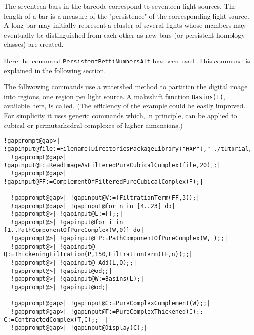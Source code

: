 \documentclass[a4paper,11pt]{report}
\begin{document}
{{\begin{Verbatim}[commandchars=!@|,fontsize=\small,frame=single,label=Example]
\end{Verbatim}
 

  

 The seventeen bars in the barcode correspond to seventeen light sources. The
length of a bar is a measure of the "persistence" of the corresponding light
source. A long bar may initially represent a cluster of several lights whose
members may eventually be distinguished from each other as new bars (or
persistent homology classes) are created. 

Here the command \texttt{PersistentBettiNumbersAlt} has been used. This command is explained in the following section. 

The follwowing commands use a watershed method to partition the digital image
into regions, one region per light source. A makeshift function \texttt{Basins(L)}, available \href{tutex/basins.g} {here}, is called. (The efficiency of the example could be easily improved. For
simplicity it uses generic commands which, in principle, can be applied to
cubical or permutarhedral complexes of higher dimensions.) 
\begin{Verbatim}[commandchars=!@|,fontsize=\small,frame=single,label=Example]
  !gapprompt@gap>| !gapinput@file:=Filename(DirectoriesPackageLibrary("HAP"),"../tutorial/images/circularGradient.png");;|
  !gapprompt@gap>| !gapinput@F:=ReadImageAsFilteredPureCubicalComplex(file,20);;|
  !gapprompt@gap>| !gapinput@FF:=ComplementOfFilteredPureCubicalComplex(F);|
  
  !gapprompt@gap>| !gapinput@W:=(FiltrationTerm(FF,3));|
  !gapprompt@gap>| !gapinput@for n in [4..23] do|
  !gapprompt@>| !gapinput@L:=[];;|
  !gapprompt@>| !gapinput@for i in [1..PathComponentOfPureComplex(W,0)] do|
  !gapprompt@>| !gapinput@ P:=PathComponentOfPureComplex(W,i);;|
  !gapprompt@>| !gapinput@ Q:=ThickeningFiltration(P,150,FiltrationTerm(FF,n));;|
  !gapprompt@>| !gapinput@ Add(L,Q);;|
  !gapprompt@>| !gapinput@od;;|
  !gapprompt@>| !gapinput@W:=Basins(L);|
  !gapprompt@>| !gapinput@od;|
  
  !gapprompt@gap>| !gapinput@C:=PureComplexComplement(W);;|
  !gapprompt@gap>| !gapinput@T:=PureComplexThickened(C);; C:=ContractedComplex(T,C);;  |
  !gapprompt@gap>| !gapinput@Display(C);|
  
\end{Verbatim}
 

  }

 
}
\end{document}
